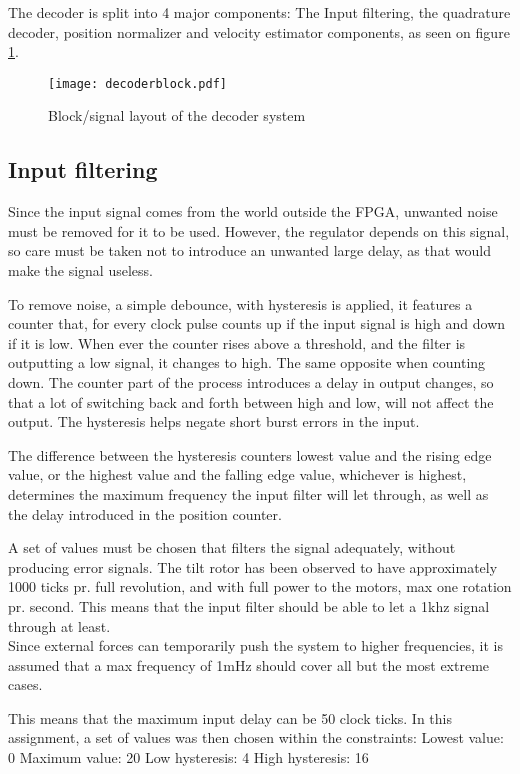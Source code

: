 The decoder is split into 4 major components: The Input filtering, the quadrature decoder, position normalizer and velocity estimator components, as seen on figure \ref{fig:decoderblock}. 



\begin{figure}[htb]
\centering
\texttt{[image: decoderblock.pdf]}
\caption{Block/signal layout of the decoder system}
\label{fig:decoderblock}
\end{figure}


\subsection{Input filtering}
Since the input signal comes from the world outside the FPGA, unwanted noise must be removed for it to be used. However, the regulator depends on this signal, so care must be taken not to introduce an unwanted large delay, as that would make the signal  useless.

To remove noise, a simple debounce, with hysteresis is applied, it features a counter that, for every clock pulse counts up if the input signal is high and down if it is low.
When ever the counter rises above a threshold, and the filter is outputting a low signal, it changes to high. The same opposite when counting down.
The counter part of the process introduces a delay in output changes, so that a lot of switching back and forth between high and low, will not affect the output. The hysteresis helps negate short burst errors in the input. 

The difference between the hysteresis counters lowest value and the rising edge value, or the highest value and the falling edge value, whichever is highest, determines the maximum frequency the input filter will let through, as well as the delay introduced in the position counter.

A set of values must be chosen that filters the signal adequately, without producing error signals. The tilt rotor has been observed to have approximately 1000 ticks pr. full revolution, and with full power to the motors, max one rotation pr. second.
This means that the input filter should be able to let a 1khz signal through at least. \\ 
Since external forces can temporarily push the system to higher frequencies, it is assumed that a max frequency of 1mHz should cover all but the most extreme cases.

This means that the maximum input delay can be 50 clock ticks.
In this assignment, a set of values was then chosen within the constraints: 
Lowest value: 0
Maximum value: 20
Low hysteresis: 4
High hysteresis: 16

